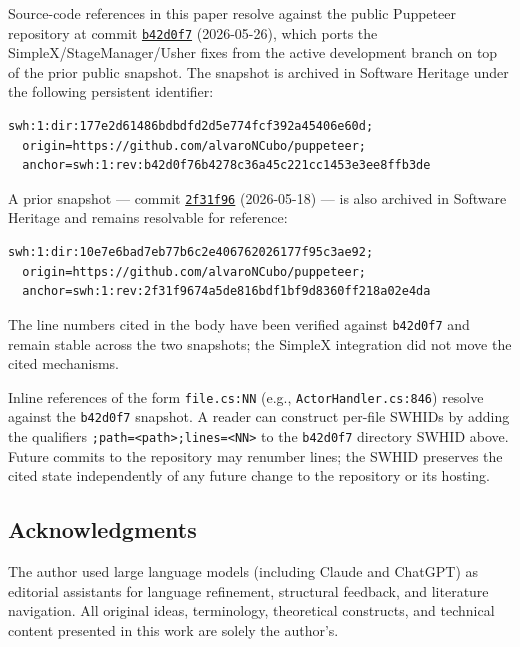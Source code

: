 \documentclass[
]{article}
\let\origtexttt\texttt%
\renewcommand{\texttt}[1]{\origtexttt{\seqsplit{#1}}}%
\let\texttt\origtexttt%
\begin{document}
Source-code references in this paper resolve against the public
Puppeteer repository at commit
\href{https://github.com/alvaroNCubo/puppeteer/tree/b42d0f76b4278c36a45c221cc1453e3ee8ffb3de}{\texttt{b42d0f7}}
(2026-05-26), which ports the SimpleX/StageManager/Usher fixes from the
active development branch on top of the prior public snapshot. The
snapshot is archived in Software Heritage under the following persistent
identifier:

\begin{verbatim}
swh:1:dir:177e2d61486bdbdfd2d5e774fcf392a45406e60d;
  origin=https://github.com/alvaroNCubo/puppeteer;
  anchor=swh:1:rev:b42d0f76b4278c36a45c221cc1453e3ee8ffb3de
\end{verbatim}

A prior snapshot --- commit
\href{https://github.com/alvaroNCubo/puppeteer/tree/2f31f9674a5de816bdf1bf9d8360ff218a02e4da}{\texttt{2f31f96}}
(2026-05-18) --- is also archived in Software Heritage and remains
resolvable for reference:

\begin{verbatim}
swh:1:dir:10e7e6bad7eb77b6c2e406762026177f95c3ae92;
  origin=https://github.com/alvaroNCubo/puppeteer;
  anchor=swh:1:rev:2f31f9674a5de816bdf1bf9d8360ff218a02e4da
\end{verbatim}

The line numbers cited in the body have been verified against
\texttt{b42d0f7} and remain stable across the two snapshots; the SimpleX
integration did not move the cited mechanisms.

Inline references of the form \texttt{file.cs:NN} (e.g.,
\texttt{ActorHandler.cs:846}) resolve against the \texttt{b42d0f7}
snapshot. A reader can construct per-file SWHIDs by adding the
qualifiers
\texttt{;path=\textless{}path\textgreater{};lines=\textless{}NN\textgreater{}}
to the \texttt{b42d0f7} directory SWHID above. Future commits to the
repository may renumber lines; the SWHID preserves the cited state
independently of any future change to the repository or its hosting.

\subsection{Acknowledgments}\label{acknowledgments}

The author used large language models (including Claude and ChatGPT) as
editorial assistants for language refinement, structural feedback, and
literature navigation. All original ideas, terminology, theoretical
constructs, and technical content presented in this work are solely the
author's.
\end{document}
